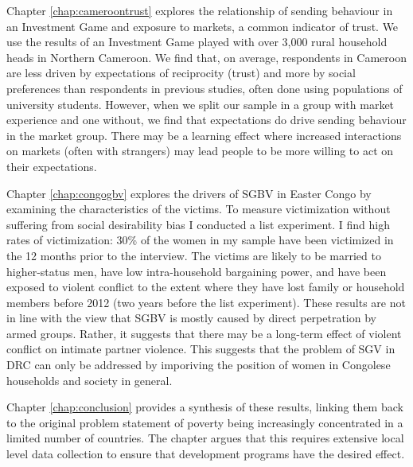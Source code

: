 Chapter \ref{chap:cameroontrust} explores the relationship of sending behaviour in an Investment Game and exposure to markets, a common indicator of trust. We use the results of an Investment Game played with over 3,000 rural household heads in Northern Cameroon. We find that, on average, respondents in Cameroon are less driven by expectations of reciprocity (trust) and more by social preferences than respondents in previous studies, often done using populations of university students. However, when we split our sample in a group with market experience and one without, we find that expectations do drive sending behaviour in the market group. There may be a learning effect where increased interactions on markets (often with strangers) may lead people to be more willing to act on their expectations.

Chapter \ref{chap:congogbv} explores the drivers of SGBV in Easter Congo by examining the characteristics of the victims. To measure victimization without suffering from social desirability bias I conducted a list experiment. I find high rates of victimization: 30\% of the women in my sample have been victimized in the 12 months prior to the interview. The victims are likely to be married to higher-status men, have low intra-household bargaining power, and have been exposed to violent conflict to the extent where they have lost family or household members before 2012 (two years before the list experiment). These results are not in line with the view that SGBV is mostly caused by direct perpetration by armed groups. Rather, it suggests that there may be a long-term effect of violent conflict on intimate partner violence. This suggests that the problem of SGV in DRC can only be addressed by imporiving the position of women in Congolese households and society in general.


Chapter \ref{chap:conclusion} provides a synthesis of these results, linking them back to the original problem statement of poverty being increasingly concentrated in a limited number of countries. The chapter argues that this requires extensive local level data collection to ensure that development programs have the desired effect.